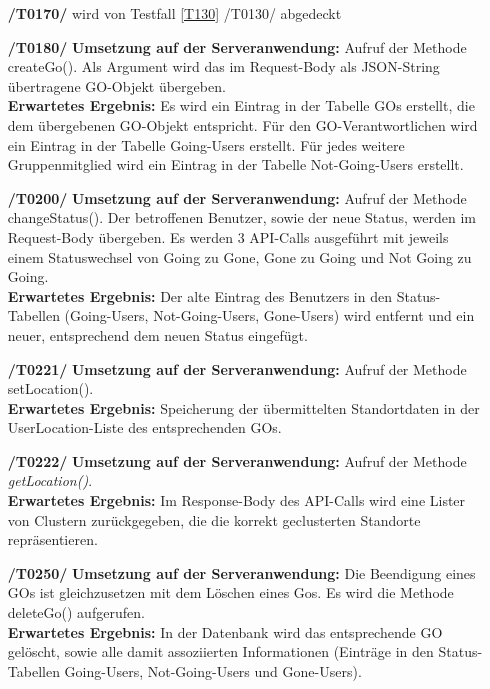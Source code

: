 \documentclass[11pt,a4paper]{scrartcl}
\begin{document}
\begin{enumerate}
	\item[\textbf{/T0170/}] wird von Testfall \ref{T130} /T0130/ abgedeckt
	
	\item[\textbf{/T0180/}]
	\textbf{Umsetzung auf der Serveranwendung: }Aufruf der Methode createGo(). Als Argument wird das im Request-Body als JSON-String übertragene GO-Objekt übergeben.\\
	\textbf{Erwartetes Ergebnis: }Es wird ein Eintrag in der Tabelle GOs erstellt, die dem übergebenen GO-Objekt entspricht. Für den GO-Verantwortlichen wird ein Eintrag in der Tabelle Going-Users erstellt. Für jedes weitere Gruppenmitglied wird ein Eintrag in der Tabelle Not-Going-Users erstellt.
	
	\item[\textbf{/T0200/}]
	\textbf{Umsetzung auf der Serveranwendung: }Aufruf der Methode changeStatus(). Der betroffenen Benutzer, sowie der neue Status, werden im Request-Body übergeben. Es werden 3 API-Calls ausgeführt mit jeweils einem Statuswechsel von Going zu Gone, Gone zu Going und Not Going zu Going.\\
	\textbf{Erwartetes Ergebnis: }Der alte Eintrag des Benutzers in den Status-Tabellen (Going-Users, Not-Going-Users, Gone-Users) wird entfernt und ein neuer, entsprechend dem neuen Status eingefügt.
	
	\item[\textbf{/T0221/}]
	\textbf{Umsetzung auf der Serveranwendung: }Aufruf der Methode setLocation().\\
	\textbf{Erwartetes Ergebnis: }Speicherung der übermittelten Standortdaten in der UserLocation-Liste des entsprechenden GOs.
	
	\item[\textbf{/T0222/}]
	\textbf{Umsetzung auf der Serveranwendung: }Aufruf der Methode \textit{getLocation()}.\\
	\textbf{Erwartetes Ergebnis: }Im Response-Body des API-Calls wird eine Lister von Clustern zurückgegeben, die die korrekt geclusterten Standorte repräsentieren.
	
	\item[\textbf{/T0250/}]
	\textbf{Umsetzung auf der Serveranwendung: }Die Beendigung eines GOs ist gleichzusetzen mit dem Löschen eines Gos. Es wird die Methode deleteGo() aufgerufen.\\
	\textbf{Erwartetes Ergebnis: }In der Datenbank wird das entsprechende GO gelöscht, sowie alle damit assoziierten Informationen (Einträge in den Status-Tabellen Going-Users, Not-Going-Users und Gone-Users).
	

\end{enumerate}
\end{document}
